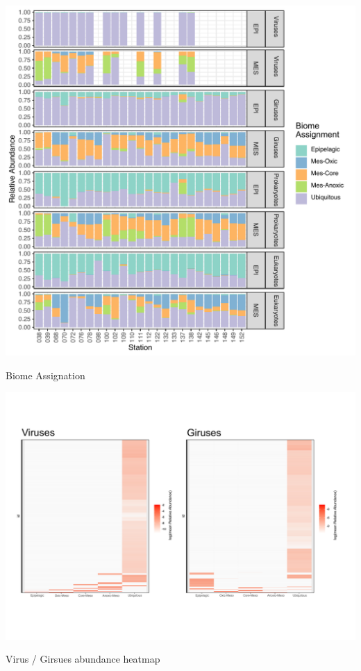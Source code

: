 \documentclass[fleqn,10pt]{wlscirep}
\begin{document}
\begin{suppfigure}[ht]
    \centering
    \includegraphics[scale=0.9]{images/simple_biome_projection_to_print.pdf}
    \caption{Biome Assignation}
    \label{fig:sim_biome}
\end{suppfigure}

\begin{suppfigure}[ht]
    \centering
    \includegraphics[scale=0.4]{images/heatmap_Vir_Gir.pdf}
    \caption{Virus / Girsues abundance heatmap}
    \label{fig:tax_virus_heatmap}
\end{suppfigure}
\end{document}
